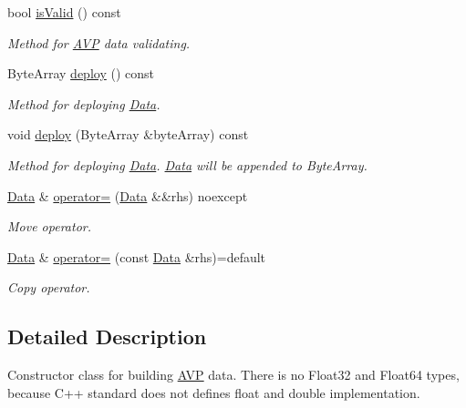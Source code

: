 \begin{DoxyCompactItemize}
bool \hyperlink{classDiameter_1_1AVP_1_1Data_adf7dd6eb3736b2d0269f57774758480e}{is\+Valid} () const
\begin{DoxyCompactList}\small\item\em Method for \hyperlink{classDiameter_1_1AVP}{A\+VP} data validating. \end{DoxyCompactList}\item 
Byte\+Array \hyperlink{classDiameter_1_1AVP_1_1Data_a71951bfda9c3be98f5c7c0e6fa5382cf}{deploy} () const
\begin{DoxyCompactList}\small\item\em Method for deploying \hyperlink{classDiameter_1_1AVP_1_1Data}{Data}. \end{DoxyCompactList}\item 
void \hyperlink{classDiameter_1_1AVP_1_1Data_a3c6e4d52e46b76b84fd8b9041638cc7f}{deploy} (Byte\+Array \&byte\+Array) const
\begin{DoxyCompactList}\small\item\em Method for deploying \hyperlink{classDiameter_1_1AVP_1_1Data}{Data}. \hyperlink{classDiameter_1_1AVP_1_1Data}{Data} will be appended to Byte\+Array. \end{DoxyCompactList}\item 
\hyperlink{classDiameter_1_1AVP_1_1Data}{Data} \& \hyperlink{classDiameter_1_1AVP_1_1Data_ae22c091934eb984ae9f0a03117ac7bf5}{operator=} (\hyperlink{classDiameter_1_1AVP_1_1Data}{Data} \&\&rhs) noexcept
\begin{DoxyCompactList}\small\item\em Move operator. \end{DoxyCompactList}\item 
\hyperlink{classDiameter_1_1AVP_1_1Data}{Data} \& \hyperlink{classDiameter_1_1AVP_1_1Data_aae8acff35ff879145a549d25320df2ea}{operator=} (const \hyperlink{classDiameter_1_1AVP_1_1Data}{Data} \&rhs)=default
\begin{DoxyCompactList}\small\item\em Copy operator. \end{DoxyCompactList}\end{DoxyCompactItemize}


\subsection{Detailed Description}
Constructor class for building \hyperlink{classDiameter_1_1AVP}{A\+VP} data. There is no Float32 and Float64 types, because C++ standard does not defines {\ttfamily float} and {\ttfamily double} implementation. 

